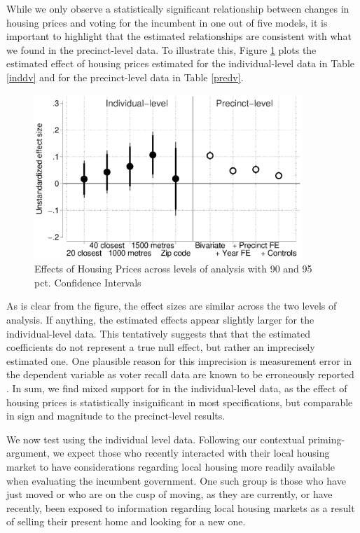 \documentclass[12pt,a4paper]{article}
\begin{document}
	While we only observe a statistically significant relationship between changes in housing prices and voting for the incumbent in one out of five models, it is important to highlight that the estimated relationships are consistent with what we found in the precinct-level data. To illustrate this, Figure \ref{comparison} plots the estimated effect of housing prices estimated for the individual-level data in Table \ref{inddv} and for the precinct-level data in Table \ref{predv}.
	
	\begin{figure}[htbp!]
		\includegraphics[width=0.9\textwidth]{../figures/comparison.eps}
		\centering
		\caption{Effects of Housing Prices across levels of analysis with 90 and 95 pct. Confidence Intervals}\label{comparison}
	\end{figure}
	
	As is clear from the figure, the effect sizes are similar across the two levels of analysis. If anything, the estimated effects appear slightly larger for the individual-level data. This tentatively suggests that that the estimated coefficients do not represent a true null effect, but rather an imprecisely estimated one. One plausible reason for this imprecision is measurement error in the dependent variable as voter recall data are known to be erroneously reported \citep[e.g.,][]{bernstein2001overreporting}. In sum, we find mixed support for \hone in the individual-level data, as the effect of housing prices is statistically insignificant in most specifications, but comparable in sign and magnitude to the precinct-level results.
	
	We now test \htwo using the individual level data. Following our contextual priming-argument, we expect those who recently interacted with their local housing market to have considerations regarding local housing more readily available when evaluating the incumbent government. One such group is those who have just moved or who are on the cusp of moving, as they are currently, or have recently, been exposed to information regarding local housing markets as a result of selling their present home and looking for a new one. 
	
\end{document}
